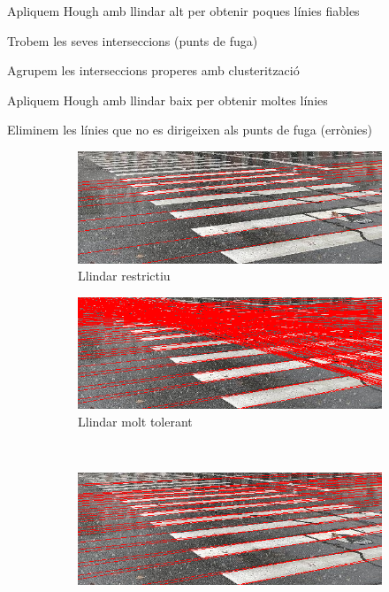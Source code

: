 \documentclass[10pt,a4paper,twocolumn,twoside]{article}
\begin{document}
\vspace*{-0.15em}
\begin{enumerate}[]
	{\small
	\item Apliquem Hough amb llindar alt per obtenir poques línies fiables
	\item Trobem les seves interseccions (punts de fuga)
	\item Agrupem les interseccions properes amb clusterització
	\item Apliquem Hough amb llindar baix per obtenir moltes línies
	\item Eliminem les línies que no es dirigeixen als punts de fuga (errònies)
}
\end{enumerate}

\begin{figure}[h]
	\centering
	\begin{subfigure}{0.45\columnwidth}
		\includegraphics[width=\linewidth]{figs/Hough_restrictiu}
		\caption{Llindar restrictiu}
	\end{subfigure}
	\quad 
	\begin{subfigure}{0.45\columnwidth}
		\includegraphics[width=\linewidth]{figs/Hough_molt_tolerant}
		\caption{Llindar molt tolerant}
	\end{subfigure}
	\ 
	\begin{subfigure}{0.45\columnwidth}
		\includegraphics[width=\linewidth]{figs/filtrat_fuga}

\end{subfigure}
\end{figure}
\end{document}
